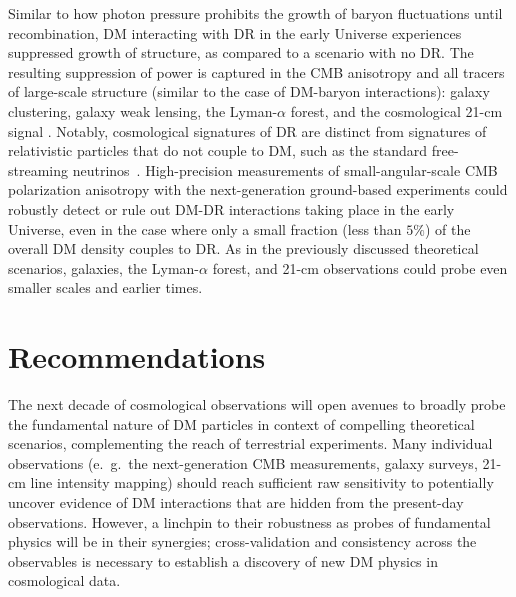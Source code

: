 \documentclass[12pt]{article}
\begin{document}
Similar to how photon pressure prohibits the growth of baryon fluctuations until recombination, DM interacting with DR in the early Universe experiences suppressed growth of structure, as compared to a scenario with no DR. 
The resulting suppression of power is captured in the CMB anisotropy and all tracers of large-scale structure (similar to the case of DM-baryon interactions): galaxy clustering, galaxy weak lensing, the Lyman-$\alpha$ forest, and the cosmological 21-cm signal \cite{Boehm:2001hm,Cyr-Racine:2013fsa,Cyr-Racine:2015ihg}. 
Notably, cosmological signatures of DR are distinct from signatures of relativistic particles that do not couple to DM, such as the standard free-streaming neutrinos~\cite{Bashinsky:2003tk,Follin:2015hya,Baumann:2015rya}.
High-precision measurements of small-angular-scale CMB polarization anisotropy with the next-generation ground-based experiments could robustly detect or rule out DM-DR interactions taking place in the early Universe, even in the case where only a small fraction (less than $5\%$) of the overall DM density couples to DR. 
As in the previously discussed theoretical scenarios, galaxies, the Lyman-$\alpha$ forest, and 21-cm observations could probe even smaller scales and earlier times. 

\vspace{-0.4cm}
\section{Recommendations}
\label{sec:recommendations}
\vspace{-0.2cm}
The next decade of cosmological observations will open avenues to broadly probe the fundamental nature of DM particles in context of compelling theoretical scenarios, complementing the reach of terrestrial experiments.
Many individual observations (e.~g.~the next-generation CMB measurements, galaxy surveys, 21-cm line intensity mapping) should reach sufficient raw sensitivity to potentially uncover evidence of DM interactions that are hidden from the present-day observations.
However, a linchpin to their robustness as probes of fundamental physics will be in their synergies; cross-validation and consistency across the observables is necessary to establish a discovery of new DM physics in cosmological data.
\end{document}
